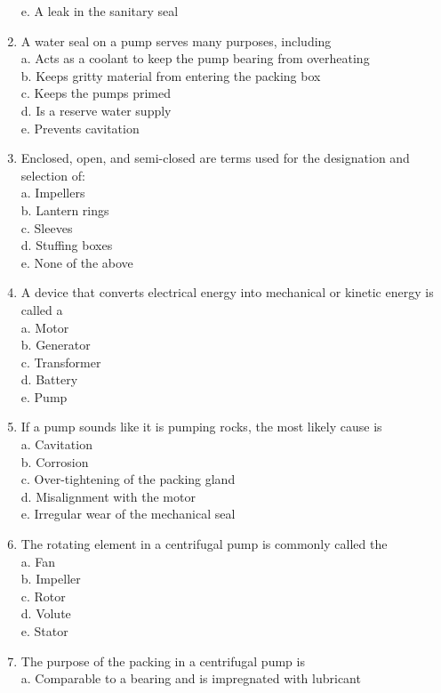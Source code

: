 \begin{enumerate}[1.]
e. A leak in the sanitary seal\\
\item A water seal on a pump serves many purposes, including\\
a. Acts as a coolant to keep the pump bearing from overheating\\
b. Keeps gritty material from entering the packing box\\
c. Keeps the pumps primed\\
d. Is a reserve water supply\\
e. Prevents cavitation\\
\item Enclosed, open, and semi-closed are terms used for the designation and selection of:\\
a. Impellers\\
b. Lantern rings\\
c. Sleeves\\
d. Stuffing boxes\\
e. None of the above\\
\item A device that converts electrical energy into mechanical or kinetic energy is called a\\
a. Motor\\
b. Generator\\
c. Transformer\\
d. Battery\\
e. Pump\\
\item If a pump sounds like it is pumping rocks, the most likely cause is\\
a. Cavitation\\
b. Corrosion\\
c. Over-tightening of the packing gland\\
d. Misalignment with the motor\\
e. Irregular wear of the mechanical seal\\
\item The rotating element in a centrifugal pump is commonly called the\\
a. Fan\\
b. Impeller\\
c. Rotor\\
d. Volute\\
e. Stator\\
\item The purpose of the packing in a centrifugal pump is\\
a. Comparable to a bearing and is impregnated with lubricant\\

\end{enumerate}
